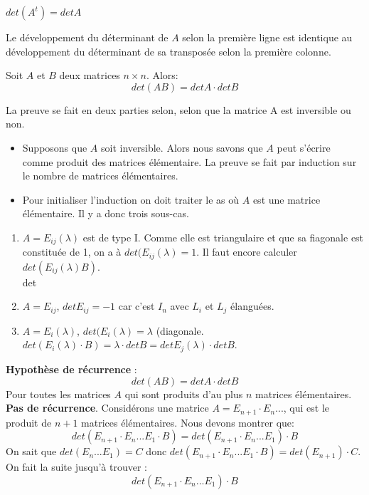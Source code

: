     \begin{theoreme}
        $det(A^t) = detA$
    \end{theoreme}
    \begin{preuve}
        Le développement du déterminant de $A$ selon la première ligne est identique au développement du déterminant de sa transposée selon la première colonne.
    \end{preuve}
    \begin{thm}
        Soit $A$ et $B$ deux matrices $n\times n$. Alors: 
        \\
        \[det(AB) = detA \cdot det B\]

    \end{thm}
    \begin{preuve}
        La preuve se fait en deux parties selon, selon que la matrice A est inversible ou non. 
        \begin{itemize}
            \item Supposons que $A$ soit inversible. Alors nous savons que $A$ peut s'écrire comme produit des matrices élémentaire. La preuve se fait par induction sur le nombre de matrices élémentaires.
            \item Pour initialiser l'induction on doit traiter le as où $A$ est une matrice élémentaire. Il y a donc trois sous-cas.

        \end{itemize}
    \end{preuve}
    \begin{enumerate}
        \item $A = E_{ij}(\lambda)$ est de type I. Comme elle est triangulaire et que sa fiagonale est constituée de 1, on a à $det(E_{ij}(\lambda) = 1$. Il faut encore calculer $det(E_{ij}(\lambda)B)$. \\ det
        \item $A = E_{ij}$, $det E_{ij} = -1$ car c'est $I_n$ avec $L_i$ et $L_j$ élanguées.
        \item $A = E_i(\lambda)$, $det(E_i(\lambda) = \lambda$ (diagonale. $det(E_i(\lambda)\cdot B) = \lambda \cdot detB = det E_{j}(\lambda)\cdot det B$.


    \end{enumerate}
    \textbf{Hypothèse de récurrence} : \[ det(AB) = det A \cdot det B\]
    Pour toutes les matrices $A$ qui sont produits d'au plus $n$ matrices élémentaires.
    \\
    \textbf{Pas de récurrence}. Considérons une matrice $A = E_{n+1} \cdot E_n ...$, qui est le produit de $n + 1$ matrices élémentaires. Nous devons montrer que:
    \[
    det(E_{n+1}\cdot E_n ... E_1 \cdot B) =  det(E_{n+1}\cdot E_n ... E_1)\cdot B    \]
    On sait que $det( E_n ... E_1) = C$ donc $det(E_{n+1}\cdot E_n ... E_1 \cdot B) = det(E_{n+1}) \cdot C$.
    On fait la suite jusqu'à trouver : \[
    det(E_{n+1}\cdot E_n ... E_1)\cdot B
    \]

